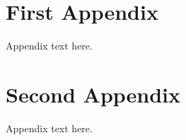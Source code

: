 \appendix

    \chapter{First Appendix}
    
        Appendix text here.
        
    \chapter{Second Appendix}
    
        Appendix text here.
    